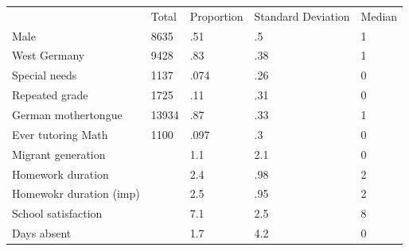 \documentclass{article}
\begin{document}
\begin{table}[!h]
\centering
\begin{tabular}{lllll}
\cline{1-5}
\multicolumn{1}{|l}{} &
  \multicolumn{1}{|l}{Total} &
  \multicolumn{1}{|l}{Proportion} &
  \multicolumn{1}{|l}{Standard Deviation} &
  \multicolumn{1}{|l|}{Median} \\
\cline{1-5}
\multicolumn{1}{|l}{Male} &
  \multicolumn{1}{|l}{8635} &
  \multicolumn{1}{|l}{.51} &
  \multicolumn{1}{|l}{.5} &
  \multicolumn{1}{|l|}{1} \\
\cline{1-5}
\multicolumn{1}{|l}{West Germany} &
  \multicolumn{1}{|l}{9428} &
  \multicolumn{1}{|l}{.83} &
  \multicolumn{1}{|l}{.38} &
  \multicolumn{1}{|l|}{1} \\
\cline{1-5}
\multicolumn{1}{|l}{Special needs} &
  \multicolumn{1}{|l}{1137} &
  \multicolumn{1}{|l}{.074} &
  \multicolumn{1}{|l}{.26} &
  \multicolumn{1}{|l|}{0} \\
\cline{1-5}
\multicolumn{1}{|l}{Repeated grade} &
  \multicolumn{1}{|l}{1725} &
  \multicolumn{1}{|l}{.11} &
  \multicolumn{1}{|l}{.31} &
  \multicolumn{1}{|l|}{0} \\
\cline{1-5}
\multicolumn{1}{|l}{German mothertongue} &
  \multicolumn{1}{|l}{13934} &
  \multicolumn{1}{|l}{.87} &
  \multicolumn{1}{|l}{.33} &
  \multicolumn{1}{|l|}{1} \\
\cline{1-5}
\multicolumn{1}{|l}{Ever tutoring Math} &
  \multicolumn{1}{|l}{1100} &
  \multicolumn{1}{|l}{.097} &
  \multicolumn{1}{|l}{.3} &
  \multicolumn{1}{|l|}{0} \\
\cline{1-5}
\multicolumn{1}{|l}{Migrant generation} &
  \multicolumn{1}{|l}{} &
  \multicolumn{1}{|l}{1.1} &
  \multicolumn{1}{|l}{2.1} &
  \multicolumn{1}{|l|}{0} \\
\cline{1-5}
\multicolumn{1}{|l}{Homework duration} &
  \multicolumn{1}{|l}{} &
  \multicolumn{1}{|l}{2.4} &
  \multicolumn{1}{|l}{.98} &
  \multicolumn{1}{|l|}{2} \\
\cline{1-5}
\multicolumn{1}{|l}{Homewokr duration (imp)} &
  \multicolumn{1}{|l}{} &
  \multicolumn{1}{|l}{2.5} &
  \multicolumn{1}{|l}{.95} &
  \multicolumn{1}{|l|}{2} \\
\cline{1-5}
\multicolumn{1}{|l}{School satisfaction} &
  \multicolumn{1}{|l}{} &
  \multicolumn{1}{|l}{7.1} &
  \multicolumn{1}{|l}{2.5} &
  \multicolumn{1}{|l|}{8} \\
\cline{1-5}
\multicolumn{1}{|l}{Days absent} &
  \multicolumn{1}{|l}{} &
  \multicolumn{1}{|l}{1.7} &
  \multicolumn{1}{|l}{4.2} &
  \multicolumn{1}{|l|}{0} \\
\cline{1-5}
\end{tabular}
\end{table}
\end{document}

